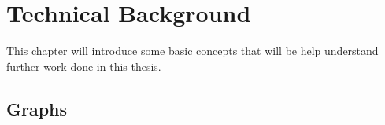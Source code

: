 \chapter{Technical Background}
\beginchapter
This chapter will introduce some basic concepts that will be help understand further work done in this thesis.

\section{Graphs}